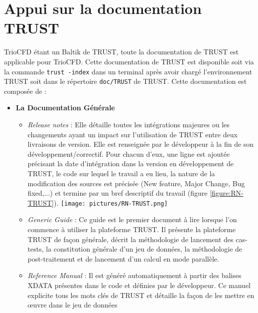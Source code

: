 

\chapter{Appui sur la documentation TRUST}
TrioCFD étant un Baltik de TRUST, toute la documentation de TRUST est applicable pour TrioCFD.
Cette documentation de TRUST est disponible
soit via la commande \texttt{trust -index} dans un terminal après avoir chargé l'environnement TRUST
soit dans le répertoire \texttt{doc/TRUST} de TRUST. Cette documentation est composée de : \\
\begin{itemize}[label=$\Rightarrow$, font=\LARGE]
  \item \textbf{ La Documentation Générale}
  \begin{itemize}
    \item \textit{Release notes} : Elle détaille toutes les intégrations majeures ou les changements ayant un impact sur l'utilisation de TRUST entre deux livraisons de version. Elle est renseignée par le développeur à la fin de son développement/correctif. Pour chacun d'eux, une ligne est ajoutée précisant la date d'intégration dans la version en développement de TRUST, le code sur lequel le travail a eu lieu, la nature de la modification des sources est précisée (New feature, Major Change, Bug fixed,...) et termine par un bref descriptif du travail (figure \ref{figure:RN-TRUST}).\newline
    \texttt{[image: pictures/RN-TRUST.png]}\vspace*{0.1cm}
  \end{itemize}
  \begin{itemize}  
    \item \textit{Generic Guide} : Ce guide est le premier document à lire lorsque l'on commence à utiliser la plateforme TRUST. Il présente la plateforme TRUST de façon générale, décrit la méthodologie de lancement des cas-tests, la constitution générale d'un jeu de données, la méthodologie de post-traitement et de lancement d'un calcul en mode parallèle. 
    \item \textit{Reference Manual} : Il est généré automatiquement à partir des balises XDATA présentes dans le code et définies par le développeur. Ce manuel explicite tous les mots clés de TRUST et détaille la façon de les mettre en œuvre dans le jeu de données

\end{itemize}
\end{itemize}
